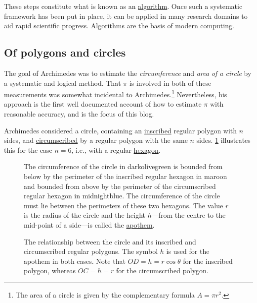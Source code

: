 \documentclass[
  a4paper,
]{article}
\begin{document}
These steps constitute what is known as an
\href{https://www.merriam-webster.com/dictionary/algorithm}{algorithm}.
Once such a systematic framework has been put in place, it can be
applied in many research domains to aid rapid scientific progress.
Algorithms are the basis of modern computing.

\subsection{Of polygons and circles}\label{of-polygons-and-circles}

The goal of Archimedes was to estimate the \emph{circumference} and
\emph{area of a circle} by a systematic and logical method. That \(\pi\)
is involved in both of these measurements was somewhat incidental to
Archimedes.\footnote{The area of a circle is given by the complementary
  formula \(A = \pi r^2\).} Nevertheless, his approach is the first well
documented account of how to estimate \(\pi\) with reasonable accuracy,
and is the focus of this blog.

Archimedes considered a circle, containing an
\href{https://mathworld.wolfram.com/Inscribed.html}{inscribed} regular
polygon with \(n\) sides, and
\href{https://mathworld.wolfram.com/Circumscribed.html}{circumscribed}
by a regular polygon with the same \(n\) sides. \cref{fig:two-limits}
illustrates this for the case \(n = 6\), i.e., with a regular
\href{https://www.britannica.com/science/hexagon}{hexagon}.

\begin{figure}
\centering

\caption{The circumference of the circle in darkolivegreen is bounded
from below by the perimeter of the inscribed regular hexagon in maroon
and bounded from above by the perimeter of the circumscribed regular
hexagon in midnightblue. The circumference of the circle must lie
between the perimeters of these two hexagons. The value \(r\) is the
radius of the circle and the height \(h\)---from the centre to the
mid-point of a side---is called the
\href{https://en.wikipedia.org/wiki/Apothem}{apothem}.}\label{fig:two-limits}
\end{figure}

\begin{figure}
\centering

\caption[The relationship between the circle and its inscribed and
circumscribed regular polygons. The symbol \(h\) is used for the apothem
in both cases. Note that \(OD = h = r\cos\theta\) for the inscribed
polygon, whereas \(OC = h = r\) for the circumscribed polygon.]{The
relationship between the circle and its inscribed and circumscribed
regular polygons. The symbol \(h\) is used for the apothem in both
cases. Note that \(OD = h = r\cos\theta\) for the inscribed polygon,
whereas \(OC = h = r\) for the circumscribed
polygon.\footnotemark{}}\label{fig:sin-theta-tan-theta}
\end{figure}
\end{document}
